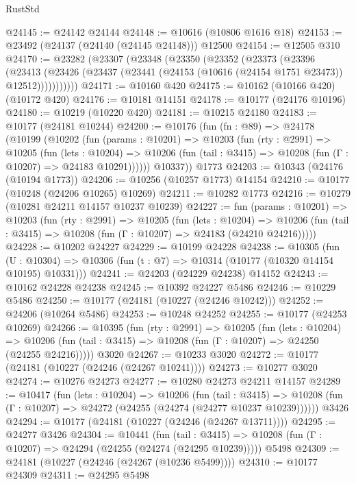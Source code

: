 \begin{lexlean}{RustStd}
\begin{coremodule}
@24145 := @24142 @24144
@24148 := @10616 (@10806 @1616 @18)
@24153 := @23492 (@24137 (@24140 (@24145 @24148))) @12500
@24154 := @12505 @310
@24170 := @23282
    (@23307
      (@23348
        (@23350
          (@23352
            (@23373
              (@23396
                (@23413
                  (@23426 (@23437 (@23441 (@24153 (@10616 (@24154 @1751 @23473)) @12512)))))))))))
@24171 := @10160 @420
@24175 := @10162 (@10166 @420) (@10172 @420)
@24176 := @10181 @14151
@24178 := @10177 (@24176 @10196)
@24180 := @10219 (@10220 @420)
@24181 := @10215 @24180
@24183 := @10177 (@24181 @10244)
@24200 := @10176
    (fun (fn : @89) =>
    @24178
      (@10199
        (@10202
          (fun (params : @10201) =>
          @10203
            (fun (rty : @2991) =>
            @10205
              (fun (lets : @10204) =>
              @10206 (fun (tail : @3415) => @10208 (fun (Γ : @10207) => @24183 @10291))))))
        @10337))
    @1773
@24203 := @10343 (@24176 (@10194 @1773))
@24206 := @10256 (@10257 @1773) @14154
@24210 := @10177 (@10248 (@24206 @10265) @10269)
@24211 := @10282 @1773
@24216 := @10279 (@10281 @24211 @14157 @10237 @10239)
@24227 := fun (params : @10201) =>
  @10203
    (fun (rty : @2991) =>
    @10205
      (fun (lets : @10204) =>
      @10206 (fun (tail : @3415) => @10208 (fun (Γ : @10207) => @24183 (@24210 @24216)))))
@24228 := @10202 @24227
@24229 := @10199 @24228
@24238 := @10305
    (fun (U : @10304) => @10306 (fun (t : @7) => @10314 (@10177 (@10320 @14154 @10195) @10331)))
@24241 := @24203 (@24229 @24238) @14152
@24243 := @10162 @24228 @24238
@24245 := @10392 @24227 @5486
@24246 := @10229 @5486
@24250 := @10177 (@24181 (@10227 (@24246 @10242)))
@24252 := @24206 (@10264 @5486)
@24253 := @10248 @24252
@24255 := @10177 (@24253 @10269)
@24266 := @10395
    (fun (rty : @2991) =>
    @10205
      (fun (lets : @10204) =>
      @10206 (fun (tail : @3415) => @10208 (fun (Γ : @10207) => @24250 (@24255 @24216)))))
    @3020
@24267 := @10233 @3020
@24272 := @10177 (@24181 (@10227 (@24246 (@24267 @10241))))
@24273 := @10277 @3020
@24274 := @10276 @24273
@24277 := @10280 @24273 @24211 @14157
@24289 := @10417
    (fun (lets : @10204) =>
    @10206
      (fun (tail : @3415) =>
      @10208 (fun (Γ : @10207) => @24272 (@24255 (@24274 (@24277 @10237 @10239))))))
    @3426
@24294 := @10177 (@24181 (@10227 (@24246 (@24267 @13711))))
@24295 := @24277 @3426
@24304 := @10441
    (fun (tail : @3415) => @10208 (fun (Γ : @10207) => @24294 (@24255 (@24274 (@24295 @10239)))))
    @5498
@24309 := @24181 (@10227 (@24246 (@24267 (@10236 @5499))))
@24310 := @10177 @24309
@24311 := @24295 @5498

\end{coremodule}
\end{lexlean}
